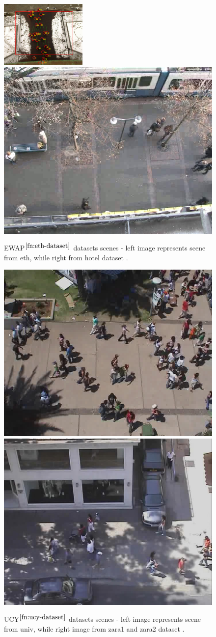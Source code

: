\begin{figure}[h]
  \centering
  \includegraphics[width=0.40\linewidth]{./figures/image-biwi.png}
  \includegraphics[width=0.40\linewidth]{./figures/biwi-hotel.png}
  \caption{EWAP$^{\ref{fn:eth-dataset}}$ datasets scenes - left image represents scene from eth, while right from hotel dataset \cite[]{UCY-crowds}.}\label{fig:eth-dataset-scenes}
\end{figure}

\begin{figure}[h]
  \centering
  \includegraphics[width=0.40\linewidth]{./figures/students_003.jpg}
  \includegraphics[width=0.40\linewidth]{./figures/crowds_zara01.jpg} %
  \caption{UCY$^{\ref{fn:ucy-dataset}}$ datasets scenes - left image represents scene from univ, while right image from zara1 and zara2 dataset \cite[]{ETH-biwi}.}\label{fig:crowds-dataset-scenes}
\end{figure}

